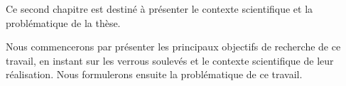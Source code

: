 Ce second chapitre est destiné à présenter le contexte scientifique et
la problématique de la thèse.




Nous commencerons par présenter les principaux objectifs de recherche
de ce travail, en instant sur les verrous soulevés et le contexte
scientifique de leur réalisation. Nous formulerons ensuite la
problématique de ce travail.


